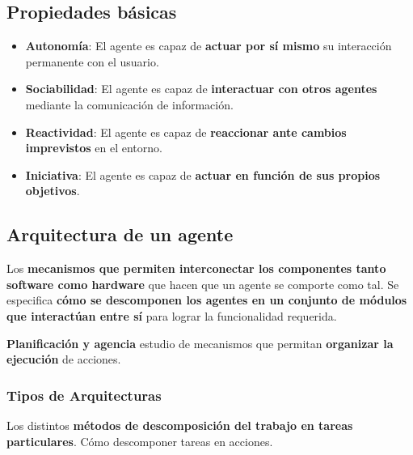 \documentclass[12pt, twoside, openright]{report} %
\begin{document}
\subsection{Propiedades básicas}
\begin{itemize}
	\item \textbf{Autonomía}: El agente es capaz de \textbf{actuar por sí mismo} su interacción permanente con el usuario.
	\item \textbf{Sociabilidad}: El agente es capaz de \textbf{interactuar con otros agentes} mediante la comunicación de información.
	\item \textbf{Reactividad}: El agente es capaz de \textbf{reaccionar ante cambios imprevistos} en el entorno.
	\item \textbf{Iniciativa}: El agente es capaz de \textbf{actuar en función de sus propios objetivos}.
\end{itemize}

\subsection{Arquitectura de un agente}
Los \textbf{mecanismos que permiten interconectar los componentes tanto software como hardware} que hacen que un agente se comporte como tal. Se especifica \textbf{cómo se descomponen los agentes en un conjunto de módulos que interactúan entre sí} para lograr la funcionalidad requerida. 

\textbf{Planificación y agencia} estudio de mecanismos que permitan \textbf{organizar la ejecución} de acciones.

\subsubsection{Tipos de Arquitecturas}
Los distintos \textbf{métodos de descomposición del trabajo en tareas particulares}. Cómo descomponer tareas en acciones. 
\end{document}
